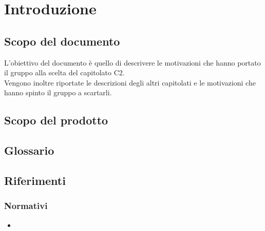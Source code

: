 \section {Introduzione}
	\subsection {Scopo del documento}
		L'obiettivo del documento è quello di descrivere le motivazioni che hanno portato il gruppo \GRUPPO{} alla scelta del capitolato C2.  \\
		Vengono inoltre riportate le descrizioni degli altri capitolati e le motivazioni che hanno spinto il gruppo a scartarli.
	\subsection {Scopo del prodotto}
		\SCOPO
	\subsection {Glossario}
		\GLOSSARIO
	\subsection {Riferimenti}
		\subsubsection {Normativi}
			\begin {itemize}
				\item \NPdoc
			\end {itemize}
